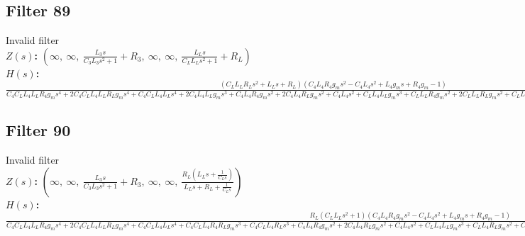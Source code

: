 \documentclass{article}
\begin{document}
\subsection*{Filter 89}
Invalid filter \\ 
\textbf{$Z(s)$:} $\left( \infty, \  \infty, \  \frac{L_{3} s}{C_{3} L_{3} s^{2} + 1} + R_{3}, \  \infty, \  \infty, \  \frac{L_{L} s}{C_{L} L_{L} s^{2} + 1} + R_{L}\right)$ \\ 
\textbf{$H(s)$:} $\frac{\left(C_{L} L_{L} R_{L} s^{2} + L_{L} s + R_{L}\right) \left(C_{4} L_{4} R_{4} g_{m} s^{2} - C_{4} L_{4} s^{2} + L_{4} g_{m} s + R_{4} g_{m} - 1\right)}{C_{4} C_{L} L_{4} L_{L} R_{4} g_{m} s^{4} + 2 C_{4} C_{L} L_{4} L_{L} R_{L} g_{m} s^{4} + C_{4} C_{L} L_{4} L_{L} s^{4} + 2 C_{4} L_{4} L_{L} g_{m} s^{3} + C_{4} L_{4} R_{4} g_{m} s^{2} + 2 C_{4} L_{4} R_{L} g_{m} s^{2} + C_{4} L_{4} s^{2} + C_{L} L_{4} L_{L} g_{m} s^{3} + C_{L} L_{L} R_{4} g_{m} s^{2} + 2 C_{L} L_{L} R_{L} g_{m} s^{2} + C_{L} L_{L} s^{2} + L_{4} g_{m} s + 2 L_{L} g_{m} s + R_{4} g_{m} + 2 R_{L} g_{m} + 1}$ \\ 
\subsection*{Filter 90}
Invalid filter \\ 
\textbf{$Z(s)$:} $\left( \infty, \  \infty, \  \frac{L_{3} s}{C_{3} L_{3} s^{2} + 1} + R_{3}, \  \infty, \  \infty, \  \frac{R_{L} \left(L_{L} s + \frac{1}{C_{L} s}\right)}{L_{L} s + R_{L} + \frac{1}{C_{L} s}}\right)$ \\ 
\textbf{$H(s)$:} $\frac{R_{L} \left(C_{L} L_{L} s^{2} + 1\right) \left(C_{4} L_{4} R_{4} g_{m} s^{2} - C_{4} L_{4} s^{2} + L_{4} g_{m} s + R_{4} g_{m} - 1\right)}{C_{4} C_{L} L_{4} L_{L} R_{4} g_{m} s^{4} + 2 C_{4} C_{L} L_{4} L_{L} R_{L} g_{m} s^{4} + C_{4} C_{L} L_{4} L_{L} s^{4} + C_{4} C_{L} L_{4} R_{4} R_{L} g_{m} s^{3} + C_{4} C_{L} L_{4} R_{L} s^{3} + C_{4} L_{4} R_{4} g_{m} s^{2} + 2 C_{4} L_{4} R_{L} g_{m} s^{2} + C_{4} L_{4} s^{2} + C_{L} L_{4} L_{L} g_{m} s^{3} + C_{L} L_{4} R_{L} g_{m} s^{2} + C_{L} L_{L} R_{4} g_{m} s^{2} + 2 C_{L} L_{L} R_{L} g_{m} s^{2} + C_{L} L_{L} s^{2} + C_{L} R_{4} R_{L} g_{m} s + C_{L} R_{L} s + L_{4} g_{m} s + R_{4} g_{m} + 2 R_{L} g_{m} + 1}$ \\ 
\end{document}
